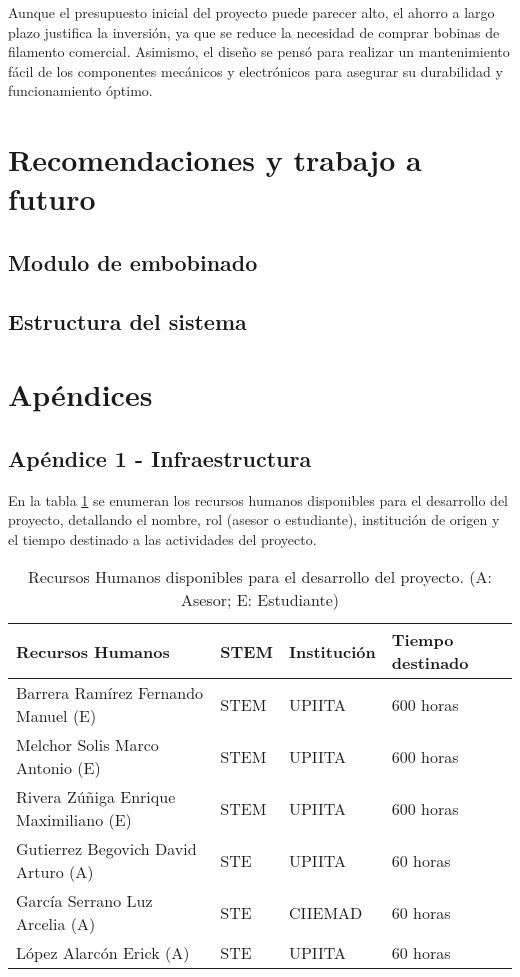 \documentclass[14pt,oneside]{extarticle} %
\begin{document}
Aunque el presupuesto inicial del proyecto puede parecer alto, el ahorro a largo plazo justifica la inversión, ya que se reduce la necesidad de comprar bobinas de filamento comercial. Asimismo, el diseño se pensó para realizar un mantenimiento fácil de los componentes mecánicos y electrónicos para asegurar su durabilidad y funcionamiento óptimo.

\section{Recomendaciones y trabajo a futuro}

\subsection{Modulo de embobinado}
\subsection{Estructura del sistema}


\newpage
\section{Apéndices}

\subsection{Apéndice 1 - Infraestructura}

En la tabla \ref{tabla:RH} se enumeran los recursos humanos disponibles para el desarrollo del proyecto, detallando el nombre, rol (asesor o estudiante), institución de origen y el tiempo destinado a las actividades del proyecto. 

\begin{table}[!h]
\centering
\small
\renewcommand{\arraystretch}{1.5}
\setlength{\tabcolsep}{10pt}
\begin{tabular}{|p{7cm}|p{1.5cm}|p{2cm}|p{3.5cm}|}
\hline
\rowcolor{gray!50}
\textbf{Recursos Humanos} & \textbf{STEM} & \textbf{Institución} & \textbf{Tiempo destinado} \\
\hline
{Barrera Ramírez Fernando Manuel (E)} & STEM & UPIITA & 600 horas \\
\hline
{Melchor Solis Marco Antonio (E)} & STEM & UPIITA & 600 horas \\
\hline
{Rivera Zúñiga Enrique Maximiliano (E)} & STEM & UPIITA & 600 horas \\
\hline
Gutierrez Begovich David Arturo (A) & STE & UPIITA  & 60 horas \\
\hline
García Serrano Luz Arcelia (A) & STE & CIIEMAD & 60 horas \\
\hline
López Alarcón Erick (A) & STE & UPIITA  & 60 horas \\
\hline
\end{tabular}
\caption{Recursos Humanos disponibles para el desarrollo del proyecto. (A: Asesor; E: Estudiante)}
\label{tabla:RH}
\end{table}
\end{document}
